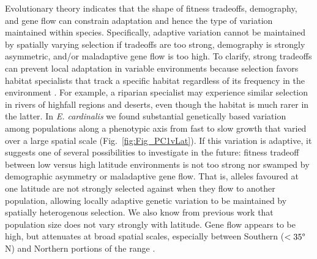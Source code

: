 \documentclass[11pt, oneside]{article}
\begin{document}
Evolutionary theory indicates that the shape of fitness tradeoffs, demography, and gene flow can constrain adaptation \citep{Levins_1968, Ronce_Kirkpatrick_2001, Lenormand_2002} and hence the type of variation maintained within species. Specifically, adaptive variation cannot be maintained by spatially varying selection if tradeoffs are too strong, demography is strongly asymmetric, and/or maladaptive gene flow is too high. To clarify, strong tradeoffs can prevent local adaptation in variable environments because selection favors habitat specialists that track a specific habitat regardless of its frequency in the environment \citep{Levins_1968}. For example, a riparian specialist may experience similar selection in rivers of highfall regions and deserts, even though the habitat is much rarer in the latter.  In \textit{E. cardinalis} we found substantial genetically based variation among populations along a phenotypic axis from fast to slow growth that varied over a large spatial scale (Fig.~\ref{fig:Fig_PC1vLat}). If this variation is adaptive, it suggests one of several possibilities to investigate in the future: fitness tradeoff between low versus high latitude environments is not too strong nor swamped by demographic asymmetry or maladaptive gene flow. That is, alleles favoured at one latitude are not strongly selected against when they flow to another population, allowing locally adaptive genetic variation to be maintained by spatially heterogenous selection. We also know from previous work that population size does not vary strongly with latitude. Gene flow appears to be high, but attenuates at broad spatial scales, especially between Southern ($<35\degree$N) and Northern portions of the range \citep{Paul_etal_2016}.  
\end{document}
